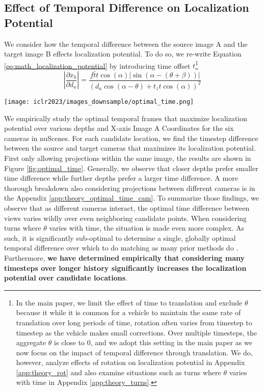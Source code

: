 \documentclass[runningheads, hyperfootnotes=false]{article}
\begin{document}
\subsection{Effect of Temporal Difference on Localization Potential}
We consider how the temporal difference between the source image A and the target image B effects localization potential. To do so, we re-write Equation \ref{eq:math_localization_potential} by introducing time offset $t$\footnote{In the main paper, we limit the effect of time to translation and exclude $\theta$ because it while it is common for a vehicle to maintain the same rate of translation over long periods of time, rotation often varies from timestep to timestep as the vehicle makes small corrections. Over multiple timesteps, the aggregate $\theta$ is close to 0, and we adopt this setting in the main paper as we now focus on the impact of temporal difference through translation. We do, however, analyze effects of rotation on localization potential in Appendix \ref{app:theory_rot} and also examine situations such as turns where $\theta$ varies with time in Appendix \ref{app:theory_turns}.}
\begin{equation}\label{eq:time_localization_potential}
\left\lvert \frac{\partial x_b}{\partial d_a} \right\rvert = \frac{f \bar{t} t \cos(\alpha) |\sin(\alpha - (\theta + \beta))|}{(d_a \cos(\alpha - \theta) + t_z t \cos(\alpha))^2}
\end{equation}

\begin{figure*}[t]
  \centering
  \texttt{[image: iclr2023/images\_downsample/optimal\_time.png]}
  \captionsetup{aboveskip=0pt}\captionsetup{belowskip=0pt}\caption{Optimal time difference over candidate locations. White regions indicate that there is no valid projection. }
  \label{fig:optimal_time}
\end{figure*} We empirically study the optimal temporal frames that maximize localization potential over various depths and X-axis Image A Coordinates for the six cameras in nuScenes. For each candidate location, we find the timestep difference between the source and target cameras that maximizes its localization potential. First only allowing projections within the same image, the results are shown in Figure \ref{fig:optimal_time}. Generally, we observe that closer depths prefer smaller time difference while further depths prefer a larger time difference. A more thorough breakdown also considering projections between different cameras is in the Appendix \ref{app:theory_optimal_time_cam}. To summarize those findings, we observe that as different cameras interact, the optimal time difference between views varies wildly over even neighboring candidate points. When considering turns where $\theta$ varies with time, the situation is made even more complex. As such, it is significantly sub-optimal to determine a single, globally optimal temporal difference over which to do matching as many prior methods do \citep{huang2021bevdet,liu2022petrv2}. Furthermore, \textbf{we have determined empirically that considering many timesteps over longer history significantly increases the localization potential over candidate locations}.
\end{document}
